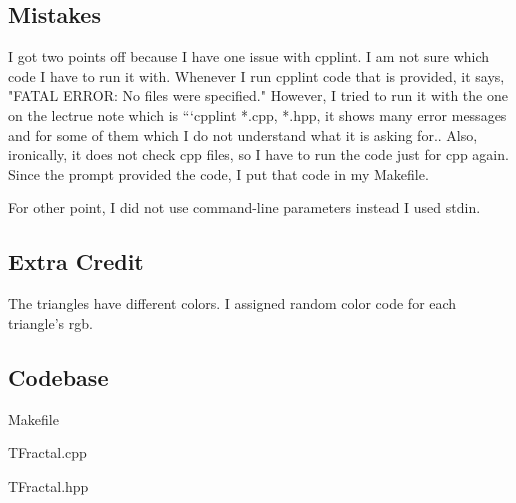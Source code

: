\subsection{Mistakes}\label{sec:ps2:mistakes}

I got two points off because I have one issue with cpplint. I am not sure which code I have to run it with. Whenever I run cpplint code that is provided, it says, "FATAL ERROR: No files were specified." However, I tried to run it with the one on the lectrue note which is ```cpplint *.cpp, *.hpp, it shows many error messages and for some of them which I do not understand what it is asking for.. Also, ironically, it does not check cpp files, so I have to run the code just for cpp again. Since the prompt provided the code, I put that code in my Makefile.

For other point, I did not use command-line parameters instead I used stdin.

\subsection{Extra Credit}\label{sec:ps2:Extra Credit}

The triangles have different colors. I assigned random color code for each triangle's rgb.

\subsection{Codebase}\label{sec:ps2:code}

Makefile

TFractal.cpp

TFractal.hpp


\newpage

